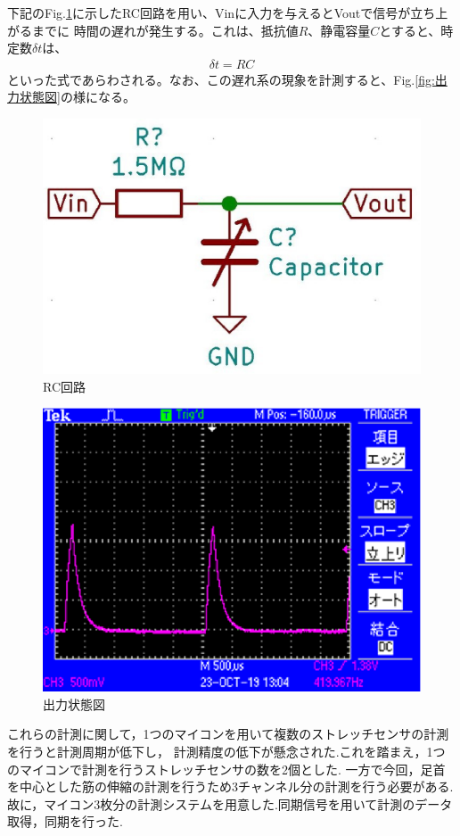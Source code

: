 下記のFig.\ref{fig:RC}に示したRC回路を用い、Vinに入力を与えるとVoutで信号が立ち上がるまでに
時間の遅れが発生する。これは、抵抗値$R$、静電容量$C$とすると、時定数$\delta t$は、
\begin{eqnarray}
    \delta t = RC
\end{eqnarray}
といった式であらわされる。なお、この遅れ系の現象を計測すると、Fig.\ref{fig:出力状態図}の様になる。

\begin{figure}[h]
 \begin{center}
  \includegraphics[width=0.5\columnwidth,clip]{./2_measurement/RC.eps}
  \caption{RC回路}
  \label{fig:RC}
 \end{center}
\end{figure}

\begin{figure}[h]
    \begin{center}
     \includegraphics[width=0.5\columnwidth,clip]{./2_measurement/oscilloscope.eps}
     \caption{出力状態図}
     \label{fing:オシロスコープ}
    \end{center}
\end{figure}

これらの計測に関して，1つのマイコンを用いて複数のストレッチセンサの計測を行うと計測周期が低下し，
計測精度の低下が懸念された.これを踏まえ，1つのマイコンで計測を行うストレッチセンサの数を2個とした.
一方で今回，足首を中心とした筋の伸縮の計測を行うため3チャンネル分の計測を行う必要がある.
故に，マイコン3枚分の計測システムを用意した.同期信号を用いて計測のデータ取得，同期を行った.

